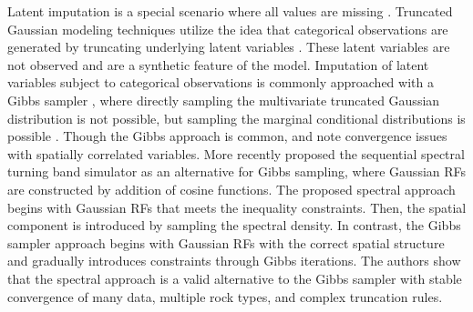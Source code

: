 Latent imputation is a special scenario where all values are missing \citep{little2019statistical}. Truncated Gaussian modeling techniques utilize the idea that categorical observations are generated by truncating underlying latent variables \citep{matheron1987conditional}. These latent variables are not observed and are a synthetic feature of the model. Imputation of latent variables subject to categorical observations is commonly approached with a Gibbs sampler \citep{geman1984stochastic}, where directly sampling the multivariate truncated Gaussian distribution is not possible, but sampling the marginal conditional distributions is possible \citep{silva2018enhanced,arroyo2020iterative,madani2021enhanced}. Though the Gibbs approach is common, \cite{emery2014simulating} and \cite{silva2018enhanced} note convergence issues with spatially correlated variables. More recently \cite{lauzon2020calibration,lauzon2020sequential,lauzon2023joint} proposed the sequential spectral turning band simulator as an alternative for Gibbs sampling, where Gaussian \glspl{RF} are constructed by addition of cosine functions. The proposed spectral approach begins with Gaussian \glspl{RF} that meets the inequality constraints. Then, the spatial component is introduced by sampling the spectral density. In contrast, the Gibbs sampler approach begins with Gaussian \glspl{RF} with the correct spatial structure and gradually introduces constraints through Gibbs iterations. The authors show that the spectral approach is a valid alternative to the Gibbs sampler with stable convergence of many data, multiple rock types, and complex truncation rules.







